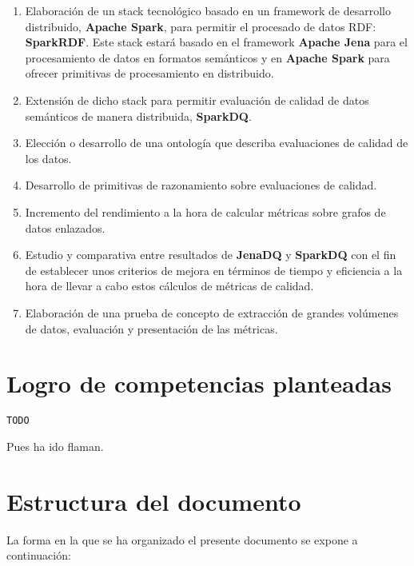 \begin{enumerate}
\item Elaboración de un stack tecnológico basado en un framework de desarrollo
  distribuido, \textbf{Apache Spark}, para permitir el procesado de datos RDF:
  \textbf{SparkRDF}. Este stack estará basado en el framework \textbf{Apache
    Jena} para el procesamiento de datos en formatos semánticos y en
  \textbf{Apache Spark} para ofrecer primitivas de procesamiento en
  distribuido.
\item Extensión de dicho stack para permitir evaluación de calidad de datos
  semánticos de manera distribuida, \textbf{SparkDQ}.
\item Elección o desarrollo de una ontología que describa evaluaciones de
  calidad de los datos.
\item Desarrollo de primitivas de razonamiento sobre evaluaciones de
  calidad.
\item Incremento del rendimiento a la hora de calcular métricas sobre
  grafos de datos enlazados.
\item Estudio y comparativa entre resultados de \textbf{JenaDQ} y
  \textbf{SparkDQ} con el fin de establecer unos criterios de mejora
  en términos de tiempo y eficiencia a la hora de llevar a cabo
  estos cálculos de métricas de calidad.
\item Elaboración de una prueba de concepto de extracción de
  grandes volúmenes de datos, evaluación y presentación de las
  métricas.
\end{enumerate}

\section{Logro de competencias planteadas}

\texttt{TODO}

Pues ha ido flaman.

\section{Estructura del documento}

La forma en la que se ha organizado el presente documento se expone a
continuación: 


